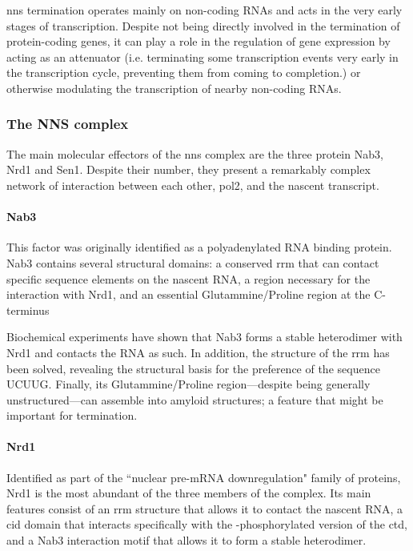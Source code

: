 \gls{nns} termination operates mainly on non-coding RNAs and acts in the very early stages of transcription.
Despite not being directly involved in the termination of protein-coding genes, it can play a role in the regulation of gene expression by acting as an attenuator (i.e. terminating some transcription events very early in the transcription cycle, preventing them from coming to completion.) or otherwise modulating the transcription of nearby non-coding RNAs.


\subsubsection{The NNS complex}

The main molecular effectors of the \gls{nns} complex are the three protein Nab3, Nrd1 and Sen1.
Despite their number, they present a remarkably complex network of interaction between each other, \gls{pol2}, and the nascent transcript.

\paragraph{Nab3}

This factor was originally identified as a polyadenylated RNA binding protein.
Nab3 contains several structural domains: a conserved \gls{rrm} that can contact specific sequence elements on the nascent RNA, a region necessary for the interaction with Nrd1, and an essential Glutammine/Proline region at the C-terminus

Biochemical experiments have shown that Nab3 forms a stable heterodimer with Nrd1 and contacts the RNA as such. 
In addition, the structure of the \gls{rrm} has been solved, revealing the structural basis for the preference of the sequence UCUUG.
Finally, its Glutammine/Proline region---despite being generally unstructured---can assemble into amyloid structures; a feature that might be important for termination.


\paragraph{Nrd1}

Identified as part of the ``nuclear pre-mRNA downregulation" family of proteins, Nrd1 is the most abundant of the three members of the complex.
Its main features consist of an \gls{rrm} structure that allows it to contact the nascent RNA, a \gls{cid} domain that interacts specifically with the \serf{}-phosphorylated version of the \gls{ctd}, and a Nab3 interaction motif that allows it to form a stable heterodimer.


